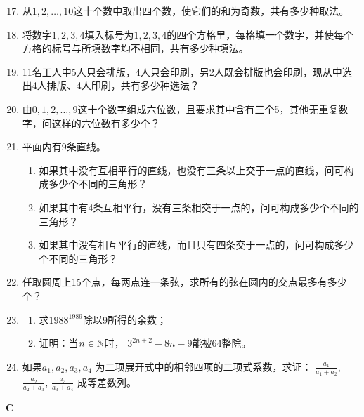 \begin{enumerate}
\setcounter{enumi}{16} 
  \item 从$1,2,\ldots,10$这十个数中取出四个数，使它们的和为奇数，共有多少种取法。
  \item 
将数字$1,2,3,4$填入标号为$1,2,3,4$的四个方格里，每格填一个数字，并使每个方格的标号与所填数字均不相同，共有多少种填法。
  \item 
11名工人中5人只会排版，4人只会印刷，另2人既会排版也会印刷，现从中选出4人排版、4人印刷，共有多少种选法？
  \item 
由$0,1,2,\ldots,9$这十个数字组成六位数，且要求其中含有三个5，其他无重复数字，问这样的六位数有多少个？

  \item 平面内有9条直线。
\begin{enumerate}[(1)]
    \item 如果其中没有互相平行的直线，也没有三条以上交于一点的直线，问可构成多少个不同的三角形？
    \item 如果其中有4条互相平行，没有三条相交于一点的，问可构成多少个不同的三角形？
    \item 如果其中没有相互平行的直线，而且只有四条交于一点的，问可构成多少个不同的三角形？
\end{enumerate}

\item 任取圆周上15个点，每两点连一条弦，求所有的弦在圆内的交点最多有多少个？
\item \begin{enumerate}[(1)]
    \item 求$ 1988^{1989} $除以9所得的余数；
    \item 证明：当$ n\in \mathbb{N} $时， $3^{2n+2}-8n-9 $能被64整除。
\end{enumerate}

\item 如果$a_{1},a_{2},a_{3},a_{4}$ 为二项展开式中的相邻四项的二项式系数，求证：
$\frac{a_{1}}{a_{1}+a_{2}}$, $\frac{a_{2}}{a_{2}+a_{3}}$, $\frac{a_{3}}{a_{3}+a_{4}}$ 成等差数列。
\end{enumerate}

\begin{center}
\bfseries C
\end{center}

